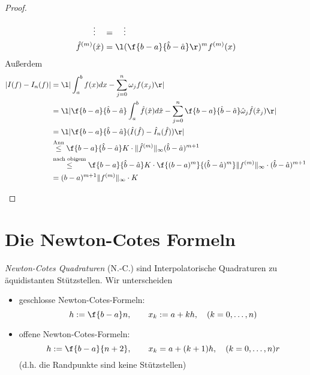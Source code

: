 \documentclass[11pt]{scrbook}
\begin{document}
\begin{st}[Koordinatentransformation]
\begin{proof}
\begin{enumerate}[i)]
\begin{align*}
					\vdots \quad &= \quad \vdots \\
					\hat f^{(m)}(\hat x) &= \l( \f {b-a}{\hat b-\hat a} \r)^m f^{(m)}(x)
				\end{align*}
				Außerdem
				\begin{align*}
					|I(f) - I_n(f)| 
					&= \l| \int_a^b f(x) dx - \sum_{j=0}^n \omega_j f(x_j) \r| \\
					&= \l| \f {b-a}{\hat b- \hat a} \int_a^b \hat f(\hat x) d\hat x - \sum_{j=0}^n \f {b-a}{\hat b - \hat a} \hat \omega_j \hat f(\hat x_j) \r| \\
					&= \l| \f {b-a}{\hat b - \hat a} (\hat I(\hat f) - \hat I_n(\hat f)) \r| \\
					&\stackrel{\text{Ann}}\le \f {b-a}{\hat b - \hat a}K\cdot \|\hat f^{(m)}\|_\infty (\hat b - \hat a)^{m+1} \\
					&\stackrel{\text{nach obigem}}\le \f {b-a}{\hat b - \hat a} K \cdot \f {(b-a)^m}{(\hat b - \hat a)^m} \|f^{(m)}\|_\infty \cdot (\hat b - \hat a)^{m+1} \\
					&= (b-a)^{m+1}\|f^{(m)}\|_\infty \cdot K
				\end{align*}
		\end{enumerate}
	\end{proof}
\end{st}


\section{Die Newton-Cotes Formeln}


\begin{df}
	\label{2.9}
	\emph{Newton-Cotes Quadraturen} (N.-C.) sind Interpolatorische Quadraturen zu äquidistanten Stützstellen.
	Wir unterscheiden
	\begin{itemize}
		\item
			geschlosse Newton-Cotes-Formeln:
			\[
				h:= \f {b-a}n, \qquad x_k := a + kh, \quad (k=0,\dotsc,n)
			\]
		\item
			offene Newton-Cotes-Formeln:
			\[
				h:= \f {b-a}{n+2}, \qquad x_k = a+ (k+1)h, \quad (k=0,\dotsc,n)r
			\]
			(d.h. die Randpunkte sind keine Stützstellen)
	\end{itemize}
\end{df}
\end{document}
